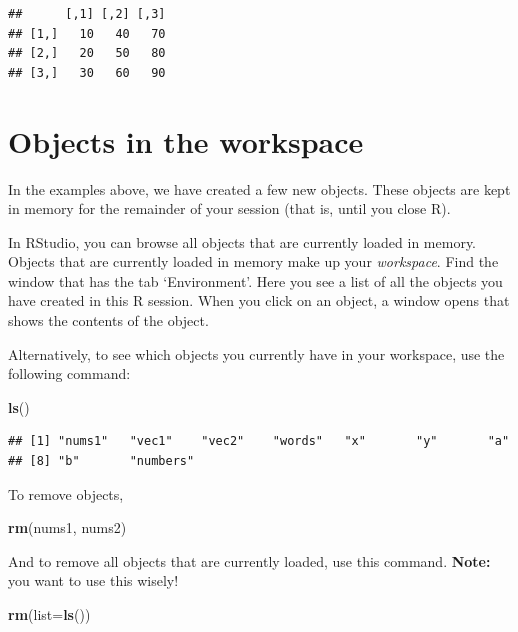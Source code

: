\documentclass[]{book}
\newenvironment{Shaded}{\begin{snugshade}}{\end{snugshade}}
\newcommand{\DataTypeTok}[1]{\textcolor[rgb]{0.13,0.29,0.53}{#1}}
\newcommand{\KeywordTok}[1]{\textcolor[rgb]{0.13,0.29,0.53}{\textbf{#1}}}
\newcommand{\NormalTok}[1]{#1}
\begin{document}
\begin{verbatim}
##      [,1] [,2] [,3]
## [1,]   10   40   70
## [2,]   20   50   80
## [3,]   30   60   90
\end{verbatim}

\hypertarget{objects-in-the-workspace}{%
\section{Objects in the workspace}\label{objects-in-the-workspace}}

In the examples above, we have created a few new objects. These objects are kept in memory for the remainder of your session (that is, until you close R).

In RStudio, you can browse all objects that are currently loaded in memory. Objects that are currently loaded in memory make up your \emph{workspace}. Find the window that has the tab `Environment'. Here you see a list of all the objects you have created in this R session. When you click on an object, a window opens that shows the contents of the object.

Alternatively, to see which objects you currently have in your workspace, use the following command:

\begin{Shaded}
\begin{Highlighting}[]
\KeywordTok{ls}\NormalTok{()}
\end{Highlighting}
\end{Shaded}

\begin{verbatim}
## [1] "nums1"   "vec1"    "vec2"    "words"   "x"       "y"       "a"      
## [8] "b"       "numbers"
\end{verbatim}

To remove objects,

\begin{Shaded}
\begin{Highlighting}[]
\KeywordTok{rm}\NormalTok{(nums1, nums2)}
\end{Highlighting}
\end{Shaded}

And to remove all objects that are currently loaded, use this command. \textbf{Note:} you want to use this wisely!

\begin{Shaded}
\begin{Highlighting}[]
\KeywordTok{rm}\NormalTok{(}\DataTypeTok{list=}\KeywordTok{ls}\NormalTok{())}
\end{Highlighting}
\end{Shaded}
\end{document}
